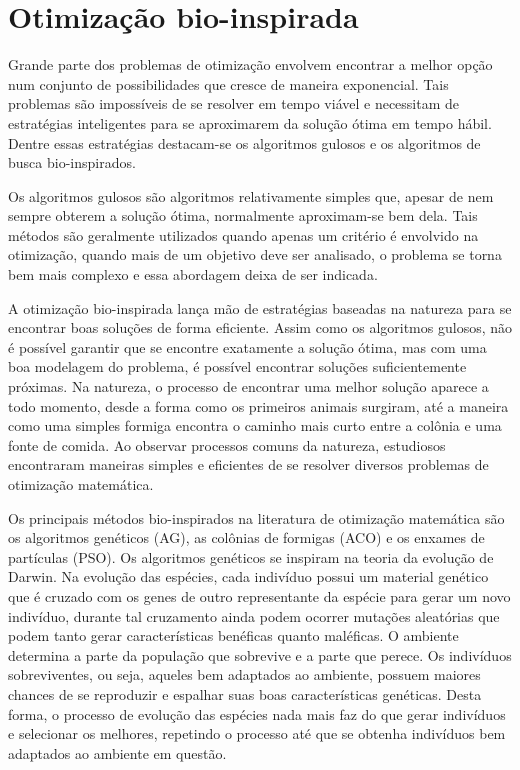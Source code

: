 \chapter[Otimização bio-inspirada]{Otimização bio-inspirada}

Grande parte dos problemas de otimização envolvem encontrar a melhor opção num conjunto de possibilidades que cresce de maneira exponencial. Tais problemas são impossíveis de se resolver em tempo viável e necessitam de estratégias inteligentes para se aproximarem da solução ótima em tempo hábil. Dentre essas estratégias destacam-se os algoritmos gulosos e os algoritmos de busca bio-inspirados.

Os algoritmos gulosos são algoritmos relativamente simples que, apesar de nem sempre obterem a solução ótima, normalmente aproximam-se bem dela. Tais métodos são geralmente utilizados quando apenas um critério é envolvido na otimização, quando mais de um objetivo deve ser analisado, o problema se torna bem mais complexo e essa abordagem deixa de ser indicada.

A otimização bio-inspirada lança mão de estratégias baseadas na natureza para se encontrar boas soluções de forma eficiente. Assim como os algoritmos gulosos, não é possível garantir que se encontre exatamente a solução ótima, mas com uma boa modelagem do problema, é possível encontrar soluções suficientemente próximas. Na natureza, o processo de encontrar uma melhor solução aparece a todo momento, desde a forma como os primeiros animais surgiram, até a maneira como uma simples formiga encontra o caminho mais curto entre a colônia e uma fonte de comida. Ao observar processos comuns da natureza, estudiosos encontraram maneiras simples e eficientes de se resolver diversos problemas de otimização matemática.

Os principais métodos bio-inspirados na literatura de otimização matemática são os algoritmos genéticos (AG), as colônias de formigas (ACO) e os enxames de partículas (PSO). Os algoritmos genéticos se inspiram na teoria da evolução de Darwin. Na evolução das espécies, cada indivíduo possui um material genético que é cruzado com os genes de outro representante da espécie para gerar um novo indivíduo, durante tal cruzamento ainda podem ocorrer mutações aleatórias que podem tanto gerar características benéficas quanto maléficas. O ambiente determina a parte da população que sobrevive e a parte que perece. Os indivíduos sobreviventes, ou seja, aqueles bem adaptados ao ambiente, possuem maiores chances de se reproduzir e espalhar suas boas características genéticas. Desta forma, o processo de evolução das espécies nada mais faz do que gerar indivíduos e selecionar os melhores, repetindo o processo até que se obtenha indivíduos bem adaptados ao ambiente em questão. 

